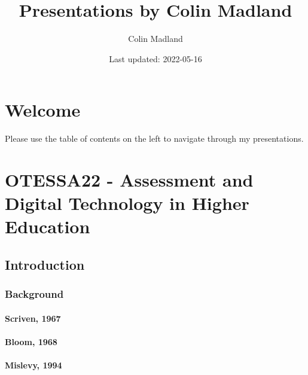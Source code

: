 \documentclass[
]{book}
\title{Presentations by Colin Madland}
\author{Colin Madland}
\date{Last updated: 2022-05-16}
\begin{document}
\maketitle

{
\setcounter{tocdepth}{1}
\tableofcontents
}
\hypertarget{welcome}{%
\chapter{Welcome}\label{welcome}}

Please use the table of contents on the left to navigate through my presentations.

\hypertarget{otessa22---assessment-and-digital-technology-in-higher-education}{%
\chapter*{OTESSA22 - Assessment and Digital Technology in Higher Education}\label{otessa22---assessment-and-digital-technology-in-higher-education}}

\hypertarget{introduction}{%
\section*{Introduction}\label{introduction}}

\hypertarget{background}{%
\subsection*{Background}\label{background}}

\hypertarget{scriven-1967}{%
\subsubsection*{Scriven, 1967}\label{scriven-1967}}

\hypertarget{bloom-1968}{%
\subsubsection*{Bloom, 1968}\label{bloom-1968}}

\hypertarget{mislevy-1994}{%
\subsubsection*{Mislevy, 1994}\label{mislevy-1994}}
\end{document}
